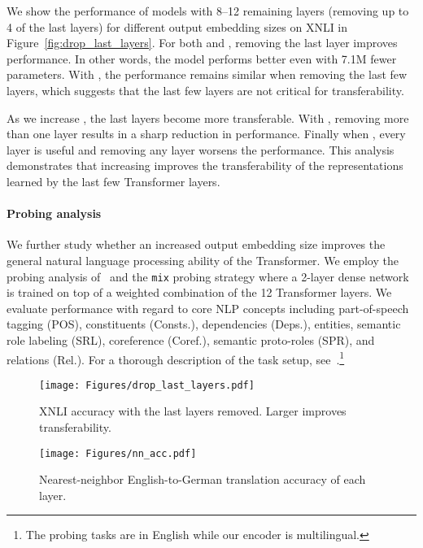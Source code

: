 \documentclass{article} \usepackage{iclr2021_conference,times}
\begin{document}
We show the performance of models with 8--12 remaining layers (removing up to 4 of the last layers) for different output embedding sizes  on XNLI in Figure~\ref{fig:drop_last_layers}. For both  and , removing the last layer improves performance. In other words, the model performs better even with 7.1M fewer parameters. With , the performance remains similar when removing the last few layers, which suggests that the last few layers are not critical for transferability. 


As we increase , the last layers become more transferable. With , removing more than one layer results in a sharp reduction in performance. Finally when , every layer is useful and removing any layer worsens the performance. This analysis demonstrates that increasing  improves the transferability of the representations learned by the last few Transformer layers.







\paragraph{Probing analysis} We further study whether an increased output embedding size improves the general natural language processing ability of the Transformer. We employ the probing analysis of~\citet{Tenney2019} and the \texttt{mix} probing strategy where a 2-layer dense network is trained on top of a weighted combination of the 12 Transformer layers. We evaluate performance with regard to core NLP concepts including part-of-speech tagging (POS), constituents (Consts.), dependencies (Deps.), entities, semantic role labeling (SRL), coreference (Coref.), semantic proto-roles (SPR), and relations (Rel.). For a thorough description of the task setup, see~\citet{Tenney2019}.\footnote{The probing tasks are in English while our encoder is multilingual.}

\begin{figure}[!t]
    \centering
    \begin{minipage}[t]{0.466\linewidth}
        \centering
        \texttt{[image: Figures/drop\_last\_layers.pdf]}
        \caption{XNLI accuracy with the last layers removed. Larger  improves transferability.}
        \label{fig:drop_last_layers}
    \end{minipage}
    \hspace{2mm}
    \begin{minipage}[t]{0.475\linewidth}
        \centering
        \texttt{[image: Figures/nn\_acc.pdf]}
\caption{Nearest-neighbor English-to-German translation accuracy of each layer.}
        \label{fig:nn_translation}
    \end{minipage}
\label{fig:invertible-adapter-variants}
\end{figure}
\end{document}
